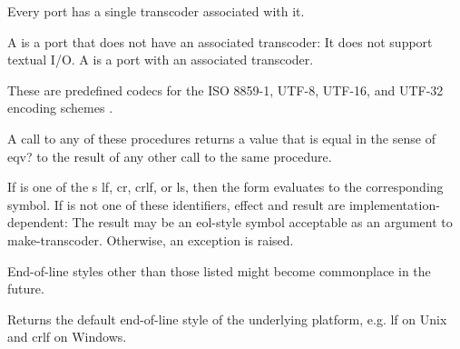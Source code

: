Every port has a single transcoder associated with it.

A  is a port that does not have an associated
transcoder: It does not support textual I/O.  A  is a port with an associated transcoder.

\begin{entry}{%
}

These are predefined codecs for the ISO 8859-1, UTF-8,
UTF-16, and UTF-32 encoding schemes \cite{Unicode}.

A call to any of these procedures returns a value that is equal in the
sense of {\cf eqv?} to the result of any other call to the same
procedure.
\end{entry}

\begin{entry}{%
}

If  is one of the s {\cf lf}, {\cf cr},
{\cf crlf}, or {\cf ls}, then the form evaluates to the corresponding
symbol.  If  is not one of these identifiers, effect and
result are implementation-dependent: The result may be an
eol-style symbol acceptable as an 
argument to {\cf make-transcoder}.  Otherwise, an exception is raised.

\begin{rationale}
  End-of-line styles other than those listed might become commonplace
  in the future.
\end{rationale}
\end{entry}

\begin{entry}{%
}

Returns the default end-of-line style of the underlying platform, e.g.
{\cf lf} on Unix and {\cf crlf} on Windows.
\end{entry}


